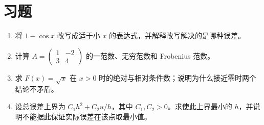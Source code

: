 \section{习题}
\begin{enumerate}[label=\arabic*.]
\item\label{exr:na-error-rational} 将 $1-\cos x$ 改写成适于小 $x$ 的表达式，并解释改写解决的是哪种误差。
\item\label{exr:na-error-norm} 计算 $A=\begin{pmatrix}1&-2\\3&4\end{pmatrix}$ 的一范数、无穷范数和 Frobenius 范数。
\item\label{exr:na-error-condition} 求 $F(x)=\sqrt x$ 在 $x>0$ 时的绝对与相对条件数；说明为什么接近零时两个结论不矛盾。
\item\label{exr:na-error-balance} 设总误差上界为 $C_1h^2+C_2u/h$，其中 $C_1,C_2>0$。求使此上界最小的 $h$，并说明不能据此保证实际误差在该点取最小值。
\end{enumerate}

